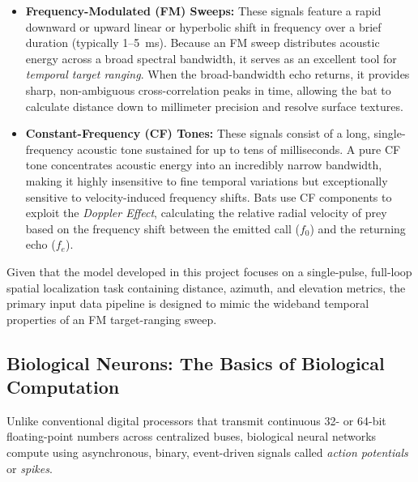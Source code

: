 \begin{itemize}
    \item \textbf{Frequency-Modulated (FM) Sweeps:} These signals feature a rapid downward or upward linear or hyperbolic shift in frequency over a brief duration (typically 1--5~ms). Because an FM sweep distributes acoustic energy across a broad spectral bandwidth, it serves as an excellent tool for \textit{temporal target ranging}. When the broad-bandwidth echo returns, it provides sharp, non-ambiguous cross-correlation peaks in time, allowing the bat to calculate distance down to millimeter precision and resolve surface textures.
    \item \textbf{Constant-Frequency (CF) Tones:} These signals consist of a long, single-frequency acoustic tone sustained for up to tens of milliseconds. A pure CF tone concentrates acoustic energy into an incredibly narrow bandwidth, making it highly insensitive to fine temporal variations but exceptionally sensitive to velocity-induced frequency shifts. Bats use CF components to exploit the \textit{Doppler Effect}, calculating the relative radial velocity of prey based on the frequency shift between the emitted call ($f_0$) and the returning echo ($f_e$).
\end{itemize}

Given that the model developed in this project focuses on a single-pulse, full-loop spatial localization task containing distance, azimuth, and elevation metrics, the primary input data pipeline is designed to mimic the wideband temporal properties of an FM target-ranging sweep.

\subsection{Biological Neurons: The Basics of Biological Computation}
Unlike conventional digital processors that transmit continuous 32- or 64-bit floating-point numbers across centralized buses, biological neural networks compute using asynchronous, binary, event-driven signals called \textit{action potentials} or \textit{spikes}. 

